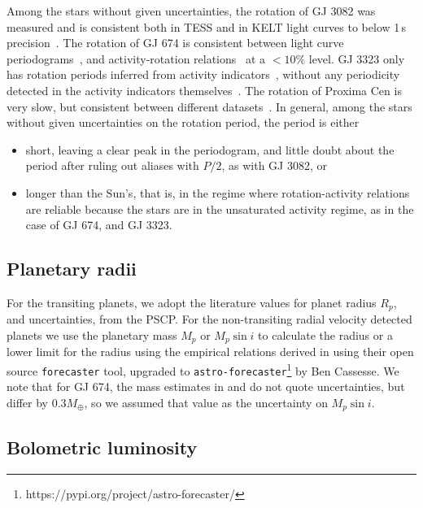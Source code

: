 \documentclass[twocolumn]{aastex631}
\begin{document}
Among the stars without given uncertainties, the rotation of GJ 3082 was measured and is consistent both in TESS and in KELT light curves to below 1\,s precision~\citep{gunther2020stellar}. The rotation of GJ 674 is consistent between light curve periodograms~\citep{kiraga2007agerotationactivity}, and activity-rotation relations~\citep{boisse2011disentangling} at a $<10\%$ level. GJ 3323 only has rotation periods inferred from activity indicators~\citep{astudillo-defru2017magnetic}, without any periodicity detected in the activity indicators themselves~\citep{astudillo-defru2017harps}. The rotation of Proxima Cen is very slow, but consistent between different datasets~\citep{anglada-escude2016terrestrial, kiraga2007agerotationactivity}. In general, among the stars without given uncertainties on the rotation period, the period is either 
\begin{itemize}
    \item short, leaving a clear peak in the periodogram, and little doubt about the period after ruling out aliases with $P/2$, as with GJ 3082, or
    \item longer than the Sun's, that is, in the regime where rotation-activity relations are reliable because the stars are in the unsaturated activity regime, as in the case of GJ 674, and GJ 3323.
\end{itemize} 


\subsection{Planetary radii}
\label{sec:data:planetradii}
For the transiting planets, we adopt the literature values for planet radius $R_p$, and uncertainties, from the PSCP. For the non-transiting radial velocity detected planets we use the planetary mass $M_p$ or $M_p\sin i$ to calculate the radius or a lower limit for the radius using the empirical relations derived in \cite{chen2017probabilistic} using their open source \texttt{forecaster} tool, upgraded to \texttt{astro-forecaster}\footnote{https://pypi.org/project/astro-forecaster/} by Ben Cassesse. We note that for GJ 674, the mass estimates in \cite{bonfils2007harps} and \cite{boisse2011disentangling} do not quote uncertainties, but differ by $0.3M_\oplus$, so we assumed that value as the uncertainty on $M_p\sin i$.

\subsection{Bolometric luminosity}
\label{sec:data:lum}
\end{document}
